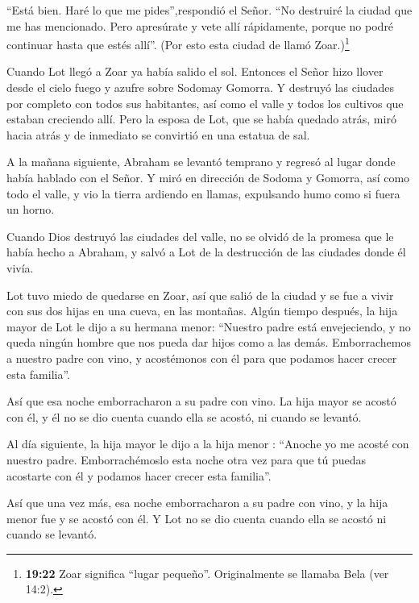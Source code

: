  ``Está bien. Haré lo que me pides'',respondió el Señor.
``No destruiré la ciudad que me has mencionado.  Pero
apresúrate y vete allí rápidamente, porque no podré continuar hasta que
estés allí''. (Por esto esta ciudad de llamó Zoar.)\footnote{\textbf{19:22}
  Zoar significa ``lugar pequeño''. Originalmente se llamaba Bela (ver
  14:2).}

 Cuando Lot llegó a Zoar ya había salido el sol.
 Entonces el Señor hizo llover desde el cielo fuego y
azufre sobre Sodomay Gomorra.  Y destruyó las ciudades por
completo con todos sus habitantes, así como el valle y todos los
cultivos que estaban creciendo allí.  Pero la esposa de
Lot, que se había quedado atrás, miró hacia atrás y de inmediato se
convirtió en una estatua de sal.

 A la mañana siguiente, Abraham se levantó temprano y
regresó al lugar donde había hablado con el Señor.  Y miró
en dirección de Sodoma y Gomorra, así como todo el valle, y vio la
tierra ardiendo en llamas, expulsando humo como si fuera un horno.

 Cuando Dios destruyó las ciudades del valle, no se olvidó
de la promesa que le había hecho a Abraham, y salvó a Lot de la
destrucción de las ciudades donde él vivía.

 Lot tuvo miedo de quedarse en Zoar, así que salió de la
ciudad y se fue a vivir con sus dos hijas en una cueva, en las montañas.
 Algún tiempo después, la hija mayor de Lot le dijo a su
hermana menor: ``Nuestro padre está envejeciendo, y no queda ningún
hombre que nos pueda dar hijos como a las demás. 
Emborrachemos a nuestro padre con vino, y acostémonos con él para que
podamos hacer crecer esta familia''.

 Así que esa noche emborracharon a su padre con vino. La
hija mayor se acostó con él, y él no se dio cuenta cuando ella se
acostó, ni cuando se levantó.

 Al día siguiente, la hija mayor le dijo a la hija menor :
``Anoche yo me acosté con nuestro padre. Emborrachémoslo esta noche otra
vez para que tú puedas acostarte con él y podamos hacer crecer esta
familia''.

 Así que una vez más, esa noche emborracharon a su padre
con vino, y la hija menor fue y se acostó con él. Y Lot no se dio cuenta
cuando ella se acostó ni cuando se levantó.

